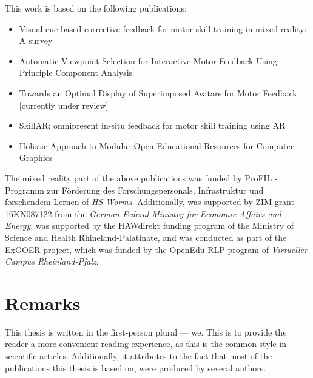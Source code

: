 This work is based on the following publications:
\begin{itemize}
	\item Visual cue based corrective feedback for motor skill training in mixed reality: A survey \cite{diller2022vcb}
	\item Automatic Viewpoint Selection for Interactive Motor Feedback Using Principle Component Analysis \cite{diller2024automatic}
	\item Towards an Optimal Display of Superimposed Avatars for Motor Feedback [currently under review]
	\item SkillAR: omnipresent in-situ feedback for motor skill training using AR \cite{diller2024skillar}
	\item Holistic Approach to Modular Open Educational Resources for Computer Graphics \cite{diller2024holistic}
\end{itemize}


The mixed reality part of the above publications was funded by ProFIL - Programm zur Förderung des Forschungspersonals, Infrastruktur und forschendem Lernen of \emph{HS Worms}. Additionally, \cite{diller2024automatic} was supported by ZIM grant 16KN087122 from the \emph{German Federal Ministry for Economic Affairs and Energy}, \cite{diller2024skillar} was supported by the HAWdirekt funding program of the Ministry of Science and Health Rhineland-Palatinate, and \cite{diller2024holistic} was conducted as part of the ExGOER project, which was funded by the OpenEdu-RLP program of \emph{Virtueller Campus Rheinland-Pfalz}.

\section{Remarks}

This thesis is written in the first-person plural --- we. This is to provide the reader a more convenient reading experience, as this is the common style in scientific articles. Additionally, it attributes to the fact that most of the publications this thesis is based on, were produced by several authors.